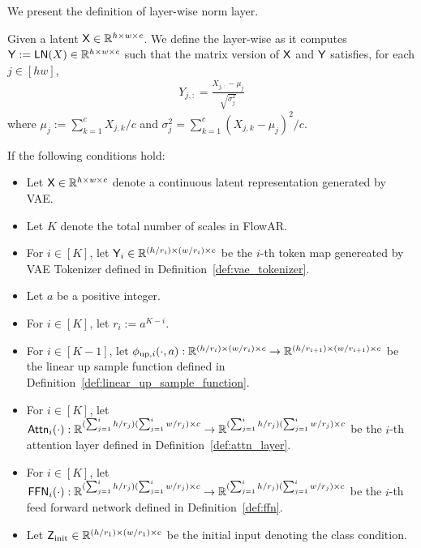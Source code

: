 We present the definition of layer-wise norm layer.
\begin{definition}\label{def:ln}
    Given a latent $\mathsf{X} \in \mathbb{R}^{h \times w \times c}$. We define the layer-wise as it computes $\mathsf{Y} := \mathsf{LN}(X) \in \mathbb{R}^{h\times w \times c}$ such that the matrix version of $\mathsf{X}$ and $\mathsf{Y}$ satisfies, for each $j \in [hw]$,
    \begin{align*}
        Y_{j,:} =  \frac{X_{j,:}-\mu_j}{\sqrt{\sigma_j^2}}
    \end{align*}
    where $\mu_j := \sum_{k=1}^c X_{j,k}/c$ and $\sigma_{j}^2 = \sum_{k=1}^c(X_{j,k}-\mu_j)^2/c$.
\end{definition}

\begin{definition}\label{def:ar_transformer}
    If the following conditions hold:
    \begin{itemize}
        \item Let $\mathsf{X} \in \mathbb{R}^{h \times w \times c}$ denote a continuous latent representation generated by VAE.
        \item Let $K$ denote the total number of scales in FlowAR.
        \item For $i \in [K]$, let $\mathsf{Y}_i \in \mathbb{R}^{(h / r_i) \times (w/r_i) \times c}$ be the $i$-th token map genereated by VAE Tokenizer defined in Definition~\ref{def:vae_tokenizer}.
        \item Let $a$ be a positive integer.
        \item For $i \in [K]$, let $r_i := a^{K-i}$.
        \item For $i \in [K-1]$, let $\phi_{\mathrm{up}, i}(\cdot, a):\mathbb{R}^{(h/r_i)\times(w/r_i)\times c} \to \mathbb{R}^{(h/r_{i+1})\times(w/r_{i+1})\times c}$ be the linear up sample function defined in Definition~\ref{def:linear_up_sample_function}.
        \item For $i \in [K]$, let $\mathsf{Attn}_i(\cdot):\mathbb{R}^{(\sum_{j=1}^i h/r_j)(\sum_{j=1}^i w/r_j) \times c} \to \mathbb{R}^{(\sum_{j=1}^i h/r_j)(\sum_{j=1}^i w/r_j) \times c}$ be the $i$-th attention layer defined in Definition~\ref{def:attn_layer}.
        \item For $i \in [K]$, let $\mathsf{FFN}_i(\cdot):\mathbb{R}^{(\sum_{j=1}^i h/r_j)(\sum_{j=1}^i w/r_j) \times c} \to \mathbb{R}^{(\sum_{j=1}^i h/r_j)(\sum_{j=1}^i w/r_j) \times c}$ be the $i$-th feed forward network defined in Definition~\ref{def:ffn}.
        \item Let $\mathsf{Z}_{\mathrm{init}} \in \mathbb{R}^{(h/r_1) \times (w/r_1) \times c}$ be the initial input denoting the class condition.

\end{itemize}
\end{definition}
